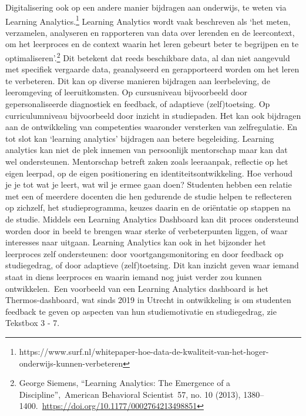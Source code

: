 \documentclass[empirical, authordate, ]{new-jote-article}
\begin{document}
	Digitalisering ook op een andere manier bijdragen aan onderwijs, te weten via Learning Analytics.\footnote{https://www.surf.nl/whitepaper-hoe-data-de-kwaliteit-van-het-hoger-onderwijs-kunnen-verbeteren} Learning Analytics wordt vaak beschreven als ‘het meten, verzamelen, analyseren en rapporteren van data over lerenden en de leercontext, om het leerproces en de context waarin het leren gebeurt beter te begrijpen en te optimaliseren'.\footnote{George Siemens, “Learning Analytics: The Emergence of a Discipline”, American Behavioral Scientist 57, no. 10 (2013), 1380--1400. \href{https://doi.org/10.1177/0002764213498851}{https://doi.org/10.1177/0002764213498851}} Dit betekent dat reeds beschikbare data, al dan niet aangevuld met specifiek vergaarde data, geanalyseerd en gerapporteerd worden om het leren te verbeteren. Dit kan op diverse manieren bijdragen aan leerbeleving, de leeromgeving of leeruitkomsten. Op cursusniveau bijvoorbeeld door gepersonaliseerde diagnostiek en feedback, of adaptieve (zelf)toetsing. Op curriculumniveau bijvoorbeeld door inzicht in studiepaden. Het kan ook bijdragen aan de ontwikkeling van competenties waaronder versterken van zelfregulatie. En tot slot kan ‘learning analytics' bijdragen aan betere begeleiding. Learning analytics kan niet de plek innemen van persoonlijk mentorschap maar kan dat wel ondersteunen. Mentorschap betreft zaken zoals leeraanpak, reflectie op het eigen leerpad, op de eigen positionering en identiteitsontwikkeling. Hoe verhoud je je tot wat je leert, wat wil je ermee gaan doen? Studenten hebben een relatie met een of meerdere docenten die hen gedurende de studie helpen te reflecteren op zichzelf, het studieprogramma, keuzes daarin en de oriëntatie op stappen na de studie. Middels een Learning Analytics Dashboard kan dit proces ondersteund worden door in beeld te brengen waar sterke of verbeterpunten liggen, of waar interesses naar uitgaan. Learning Analytics kan ook in het bijzonder het leerproces zelf ondersteunen: door voortgangsmonitoring en door feedback op studiegedrag, of door adaptieve (zelf)toetsing. Dit kan inzicht geven waar iemand staat in diens leerproces en waarin iemand nog juist verder zou kunnen ontwikkelen. Een voorbeeld van een Learning Analytics dashboard is het Thermos-dashboard, wat sinds 2019 in Utrecht in ontwikkeling is om studenten feedback te geven op aspecten van hun studiemotivatie en studiegedrag, zie Tekstbox 3 - 7.
\end{document}
